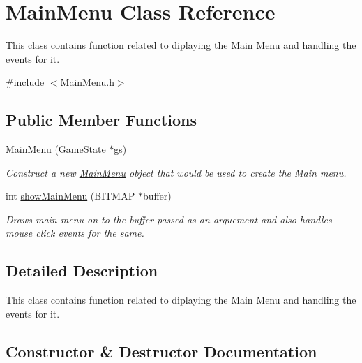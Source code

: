 \hypertarget{class_main_menu}{}\section{Main\+Menu Class Reference}
\label{class_main_menu}


This class contains function related to diplaying the Main Menu and handling the events for it.  




{\ttfamily \#include $<$Main\+Menu.\+h$>$}

\subsection*{Public Member Functions}
\begin{DoxyCompactItemize}
\item 
\mbox{\hyperlink{class_main_menu_a1e35dbcf22d47211a1b24af8da859598}{Main\+Menu}} (\mbox{\hyperlink{struct_game_state}{Game\+State}} $\ast$gs)
\begin{DoxyCompactList}\small\item\em Construct a new \mbox{\hyperlink{class_main_menu}{Main\+Menu}} object that would be used to create the Main menu. \end{DoxyCompactList}\item 
int \mbox{\hyperlink{class_main_menu_acfaacbf0ebc40eefd97604167eb133c2}{show\+Main\+Menu}} (B\+I\+T\+M\+AP $\ast$buffer)
\begin{DoxyCompactList}\small\item\em Draws main menu on to the buffer passed as an arguement and also handles mouse click events for the same. \end{DoxyCompactList}\end{DoxyCompactItemize}


\subsection{Detailed Description}
This class contains function related to diplaying the Main Menu and handling the events for it. 



\subsection{Constructor \& Destructor Documentation}
\mbox{\label{class_main_menu_a1e35dbcf22d47211a1b24af8da859598}} 
